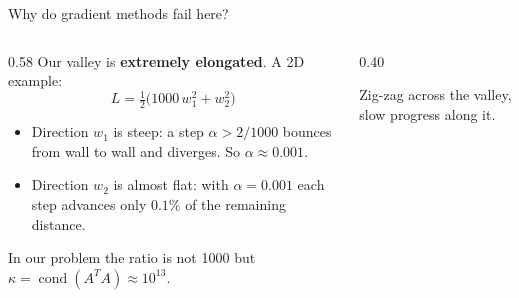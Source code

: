 \documentclass[10pt,aspectratio=169]{beamer}
\newcommand{\hl}[1]{\textcolor{accent}{\textbf{#1}}}
\begin{document}
\begin{frame}{Why do gradient methods fail here?}
  \begin{columns}[c]
    \begin{column}{0.58\textwidth}
      Our valley is \hl{extremely elongated}. A 2D example:
      \[
        L = \tfrac12\big(1000\,w_1^2 + w_2^2\big)
      \]
      \begin{itemize}
        \item Direction $w_1$ is steep: a step $\alpha > 2/1000$ bounces from
              wall to wall and diverges. So $\alpha \approx 0.001$.
        \item Direction $w_2$ is almost flat: with $\alpha=0.001$ each step
              advances only $0.1\%$ of the remaining distance.
      \end{itemize}
      \vspace{0.3em}
      In our problem the ratio is not 1000 but
      $\kappa = \operatorname{cond}(A^TA) \approx 10^{13}$.
    \end{column}
    \begin{column}{0.40\textwidth}
      \centering

      {\scriptsize Zig-zag across the valley, slow progress along it.}
    \end{column}
  \end{columns}
\end{frame}
\end{document}
